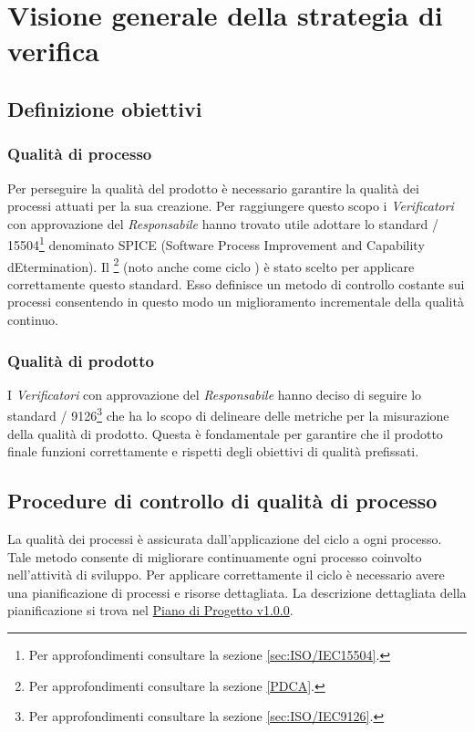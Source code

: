 \documentclass{scalatekids-article}
\begin{document}
\section{Visione generale della strategia di verifica}
\subsection{Definizione obiettivi}
\subsubsection{Qualità di processo}
Per perseguire la qualità del prodotto è necessario garantire la qualità dei processi attuati per la sua creazione. Per raggiungere questo scopo i \textit{Verificatori} con approvazione del \textit{Responsabile} hanno trovato utile adottare lo standard / 15504\footnote[1]{Per approfondimenti consultare la sezione \ref{sec:ISO/IEC15504}.} denominato SPICE (Software Process Improvement and Capability dEtermination). Il \footnote[2]{Per approfondimenti consultare la sezione \ref{PDCA}.} (noto anche come ciclo ) è stato scelto per applicare correttamente questo standard. Esso definisce un metodo di controllo costante sui processi consentendo in questo modo un miglioramento incrementale della qualità continuo.
\subsubsection{Qualità di prodotto}
I \textit{Verificatori} con approvazione del \textit{Responsabile} hanno deciso di seguire lo standard / 9126\footnote[3]{Per approfondimenti consultare la sezione \ref{sec:ISO/IEC9126}.} che ha lo scopo di delineare delle metriche per la misurazione della qualità di prodotto. Questa è fondamentale per garantire che il prodotto  finale funzioni correttamente e rispetti degli obiettivi di qualità prefissati.
\subsection{Procedure di controllo di qualità di processo}
La qualità dei processi è assicurata dall'applicazione del ciclo  a ogni processo. Tale metodo consente di migliorare continuamente ogni processo coinvolto nell’attività di sviluppo. Per applicare correttamente il ciclo  è necessario avere una pianificazione di processi e risorse dettagliata. La descrizione dettagliata della pianificazione si trova nel \href{run:./PianoDiProgetto\_v1.0.0.pdf}{Piano di Progetto v1.0.0}.\\
\end{document}
